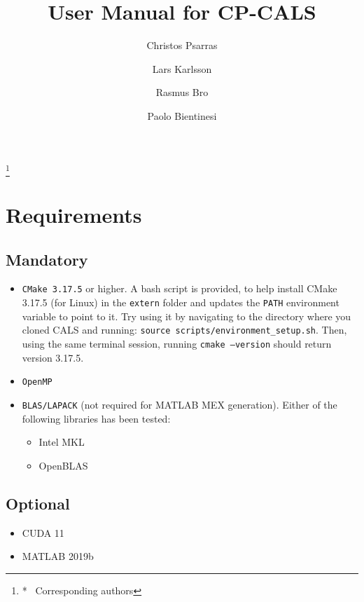 \documentclass[preprint]{acmart}
\newcommand{\hlctexttt}[1]{\texttt{\colorbox{cyan!10}{#1}}}
\newcommand{\hlgtexttt}[1]{\texttt{\colorbox{lightgray!15}{#1}}}
\newcommand{\code}[1]{\hlgtexttt{#1}}
\newcommand{\hlight}[1]{\hlctexttt{#1}}
\begin{document}
\title{User Manual for CP-CALS}

\author{Christos Psarras}
\author{Lars Karlsson}
\author{Rasmus Bro}
\author{Paolo Bientinesi}
\thanks{*~ Corresponding authors}

\maketitle

\section{Requirements}

\subsection{Mandatory}
\begin{itemize}
    \item \hlight{CMake 3.17.5} or higher.
    A bash script is provided, to help install CMake 3.17.5 (for Linux) in the \code{extern} folder and updates the \code{PATH} environment variable to point to it. Try using it by navigating to the directory where you cloned CALS and running: \code{source scripts/environment\_setup.sh}. Then, using the same terminal session, running \code{cmake --version} should return version 3.17.5.
    \item \hlight{OpenMP}
    \item \hlight{BLAS/LAPACK} (not required for MATLAB MEX generation). Either of the following libraries has been tested:
    \begin{itemize}
        \item Intel MKL
        \item OpenBLAS
    \end{itemize}
\end{itemize}

\subsection{Optional}
\begin{itemize}
    \item CUDA 11
    \item MATLAB 2019b
\end{itemize}
\end{document}
